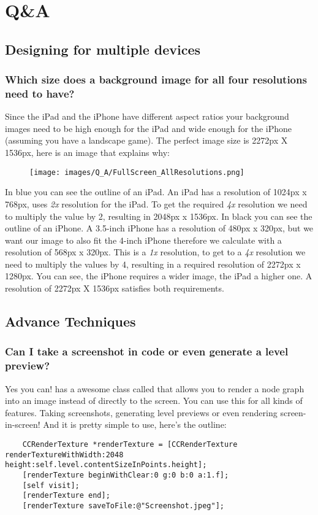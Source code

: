 \chapter{Q\&A}

\section{Designing for multiple devices}

\subsection{Which size does a background image for all four resolutions need to
have?}\label{background_all_resolutions}
Since the iPad and the iPhone have different aspect ratios your
background images need to be high enough for the iPad and wide enough for the
iPhone (assuming you have a landscape game). The perfect image size is 2272px X
1536px, here is an image that explains why:

\begin{figure}[H]
		\centering
		\texttt{[image: images/Q\_A/FullScreen\_AllResolutions.png]}
\end{figure}

In blue you can see the outline of an iPad. An iPad has a resolution of
1024px x 768px, \SB{} uses \textit{2x} resolution for the iPad. To get the
required \textit{4x} resolution we need to multiply the value by 2, resulting in 2048px x 1536px.
In black you can see the outline of an iPhone. A 3.5-inch iPhone has a resolution
of 480px x 320px, but we want our image to also fit the 4-inch iPhone therefore
we calculate with a resolution of 568px x 320px. This is a \textit{1x}
resolution, to get to a \textit{4x} resolution we need to multiply the values by
4, resulting in a required resolution of 2272px x 1280px. You can see, the
iPhone requires a wider image, the iPad a higher one. A resolution of 2272px X
1536px satisfies both requirements. 

\section{Advance Techniques}
\subsection{Can I take a screenshot in code or even generate a level preview?}
Yes you can! \cocos{} has a awesome class called 
that allows you to render a node graph into an image instead of directly to the
screen. You can use this for all kinds of features. Taking screenshots,
generating level previews or even rendering screen-in-screen!
And it is pretty simple to use, here's the outline:
\begin{lstlisting}
    CCRenderTexture *renderTexture = [CCRenderTexture renderTextureWithWidth:2048 height:self.level.contentSizeInPoints.height];
    [renderTexture beginWithClear:0 g:0 b:0 a:1.f];
    [self visit];
    [renderTexture end];
    [renderTexture saveToFile:@"Screenshot.jpeg"];
\end{lstlisting} 
